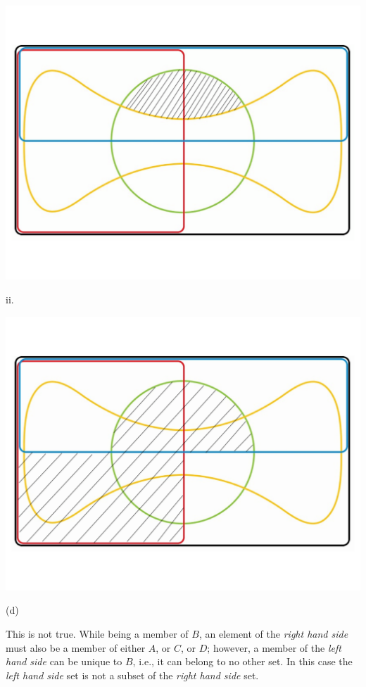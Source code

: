 \documentclass[UTF8,12pt,letterpaper,oneside]{amsart}
\begin{document}
\includegraphics[scale=0.4]{hw1-4venn2.pdf}

ii. 

\includegraphics[scale=0.4]{hw1-4venn3.pdf}

(d)

This is not true. While being a member of $B$, an element of the \textit{right hand side} must also be a member of either $A$, or $C$, or $D$; however, a member of the \textit{left hand side} can be unique to $B$, i.e., it can belong to no other set. In this case the \textit{left hand side} set is not a subset of the \textit{right hand side} set.
\end{document}
